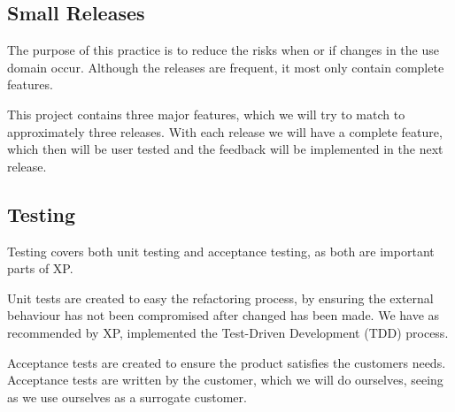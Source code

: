 \subsection{Small Releases}
The purpose of this practice is to reduce the risks when or if changes in the use domain occur.
Although the releases are frequent, it most only contain complete features.

This project contains three major features, which we will try to match to approximately three releases.
With each release we will have a complete feature, which then will be user tested and the feedback will be implemented in the next release.

\subsection{Testing}
Testing covers both unit testing and acceptance testing, as both are important parts of XP.

Unit tests are created to easy the refactoring process, by ensuring the external behaviour has not been compromised after changed has been made.
We have as recommended by XP, implemented the Test-Driven Development (TDD) process.

Acceptance tests are created to ensure the product satisfies the customers needs.
Acceptance tests are written by the customer, which we will do ourselves, seeing as we use ourselves as a surrogate customer.


